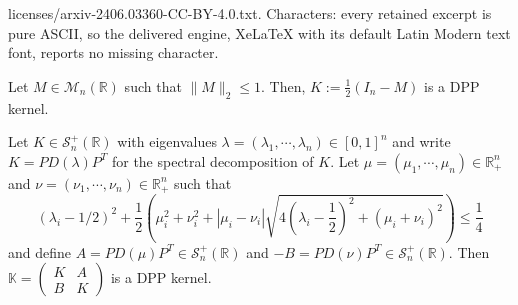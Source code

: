 \documentclass[10pt,a4paper]{amsart}
\newcommand{\bR}{\mathbb{R}}
\newcommand{\defeq}{:=}
\renewcommand{\leq}{\leqslant}
\begin{document}
licenses/arxiv-2406.03360-CC-BY-4.0.txt. Characters: every retained excerpt is pure ASCII, so the delivered engine, XeLaTeX with its default Latin Modern text font, reports no missing character.
\begin{proposition}\label{prop: perturb_half_identity}
Let $M\in\mathcal{M}_n(\bR)$ such that $\|M\|_2\leq 1$. Then, $K\defeq \frac{1}{2}(I_n-M)$ is a DPP kernel.
\end{proposition}

\begin{proposition}\label{prop: Construction_Coupling}
Let $K\in\mathcal{S}^+_n(\bR)$ with eigenvalues $\lambda=(\lambda_1,\cdots,\lambda_n)\in[0, 1]^n$ and write $K=PD(\lambda)P^T$ for the spectral decomposition of $K$. Let $\mu=(\mu_1,\cdots,\mu_n)\in\bR_+^n$ and $\nu=(\nu_1,\cdots,\nu_n)\in\bR_+^n$ such that
\begin{equation}\label{eq: Bound_ev}
(\lambda_i-1/2)^2 + \frac{1}{2}\left(\mu_i^2+\nu_i^2 + |\mu_i-\nu_i|\sqrt{4\left(\lambda_i-\frac{1}{2}\right)^2+(\mu_i+\nu_i)^2}\right)\leq\frac{1}{4}
\end{equation}
and define $A=PD(\mu)P^T\in\mathcal{S}^+_n(\bR)$ and $-B=PD(\nu)P^T\in\mathcal{S}^+_n(\bR)$. Then $\mathbb{K}=\begin{pmatrix}
K & A \\ B & K
\end{pmatrix}$ is a DPP kernel.
\end{proposition}
\end{document}
